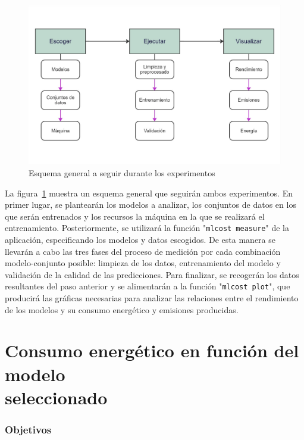 \begin{figure}[H]
  \centerline{
     \includegraphics[width=\textwidth, keepaspectratio]{img/test-structure.jpg}
  }
  \caption{Esquema general a seguir durante los experimentos}
  \label{fig:esquema-experimentos}
\end{figure}

La figura~\ref{fig:esquema-experimentos} muestra un esquema general que seguirán ambos experimentos. En primer lugar, se plantearán los modelos a analizar, los conjuntos de datos en los que serán entrenados y los recursos la máquina en la que se realizará el entrenamiento. Posteriormente, se utilizará la función "\texttt{mlcost measure}" de la aplicación, especificando los modelos y datos escogidos. De esta manera se llevarán a cabo las tres fases del proceso de medición por cada combinación modelo-conjunto posible: limpieza de los datos, entrenamiento del modelo y validación de la calidad de las predicciones. Para finalizar, se recogerán los datos resultantes del paso anterior y se alimentarán a la función "\texttt{mlcost plot}", que producirá las gráficas necesarias para analizar las relaciones entre el rendimiento de los modelos y su consumo energético y emisiones producidas.

\section{Consumo energético en función del modelo\\ seleccionado}
\label{sec:test-1-models}

\subsubsection{Objetivos}

